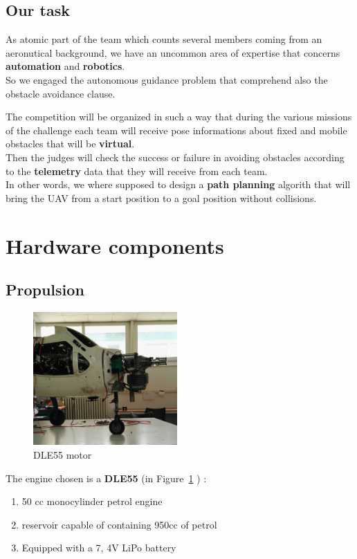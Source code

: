 \documentclass[oneside,onecolumn]{article}
\begin{document}
\subsection{Our task}
As atomic part of the team which counts several members coming from an
aeronutical background, we have an uncommon area of expertise that concerns
\textbf{automation} and \textbf{robotics}.\\ So we engaged the autonomous guidance problem that
comprehend also the obstacle avoidance clause.\par
The competition will be organized in such a way that during the various missions
of the challenge each team will receive pose informations about fixed and mobile
obstacles that will be \textbf{virtual}.\\
Then the judges will check the success or failure in avoiding obstacles
according to the \textbf{telemetry} data that they will receive from each team.\\
In other words, we where supposed to design a \textbf{path planning} algorith
that will bring the UAV from a start position to a goal position without collisions.




\section{Hardware components}

\subsection{Propulsion}
\begin{figure}
  \caption{DLE55 motor}\label{wrap-fig:2}
  \includegraphics[width=5.5cm]{YAK3}
\end{figure} 



The engine chosen is a \textbf{DLE55} (in Figure~\ref{wrap-fig:2} ) :

\begin{enumerate}
\item 50 cc monocylinder petrol engine
\item reservoir capable of containing 950cc of petrol
\item Equipped with a 7, 4V LiPo battery
\end{enumerate}
\end{document}
